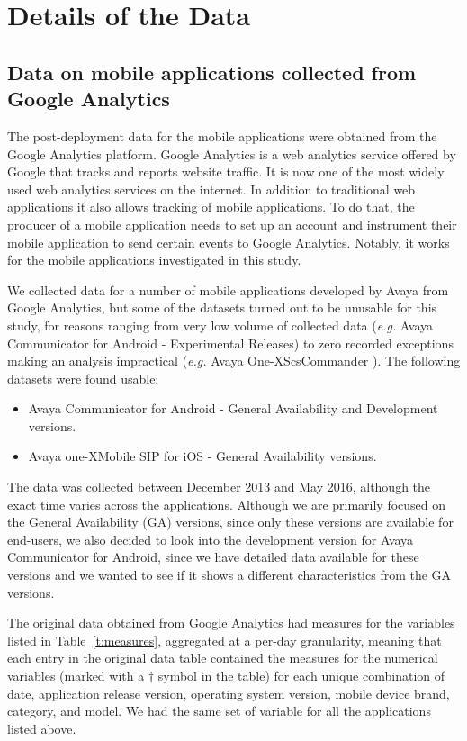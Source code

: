 \documentclass[smallextended]{svjour3}       %
\begin{document}
\section{Details of the Data}\label{s:data}

\subsection{Data on mobile applications collected from Google Analytics}
The post-deployment data for the mobile applications were obtained from the 
Google Analytics platform.
Google Analytics is a web analytics service offered by
Google that tracks and reports website traffic. It is now one of the most
widely used web analytics services on the internet. In addition to
traditional web applications it also allows tracking of mobile
applications. To do that, the producer of a mobile application needs
to set up an account and instrument their mobile application to send certain
events to Google Analytics. Notably, it works for the mobile
applications investigated in this study. 

We collected data for a number of mobile applications developed by Avaya from Google Analytics, but some of the datasets turned out to be unusable for this study, for reasons ranging from very low volume of collected data (\textit{e.g.} Avaya Communicator for Android - Experimental Releases) to zero recorded exceptions making an analysis impractical (\textit{e.g.} Avaya One-X\textregistered   ScsCommander ). The following datasets were found usable:
\begin{itemize}
    \item Avaya Communicator for Android - General Availability and Development versions.
    \item Avaya one-X\textregistered Mobile  SIP for  iOS - General Availability versions.
\end{itemize}

The data was collected between December 2013 and May 2016, although the exact time varies across the applications. Although we are primarily focused on the General Availability (GA) versions, since only these versions are available for end-users, we also decided to look into the development version for Avaya Communicator for Android, since we have detailed data available for these versions and we wanted to see if it shows a different characteristics from the GA versions.  

The original data obtained from Google Analytics had measures for the variables 
listed in Table~\ref{t:measures}, aggregated at a per-day granularity, meaning 
that each entry in the original data table contained the measures for the numerical 
variables (marked with a $\dagger$ symbol in the table) for each unique combination
of date, application release version, operating system version, mobile device brand, 
category, and model. We had the same set of variable for all the applications listed above.
\end{document}
